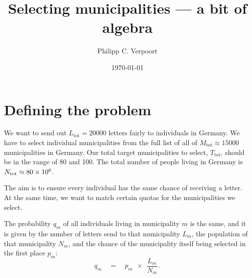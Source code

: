 \documentclass[%
 draft,
 aapm,
 mph,%
 amsmath,amssymb,
 reprint,%
]{revtex4-2}
\begin{document}
\title{Selecting municipalities — a bit of algebra}
\author{Philipp C. Verpoort}
\date{\today}


\newcommand{\secref}[2][]{Sec.~\ref{sec:#2}#1}
\newcommand{\figref}[2][]{Fig.~\ref{fig:#2}#1}
\newcommand{\tabref}[2][]{Tab.~\ref{tab:#2}#1}
\newcommand{\eqnref}[2][]{Eq.~(\ref{eq:#2}#1)}
\newcommand{\subfig}[1]{{\bf(#1)}}

\newcommand{\Ltot}{L_{\mathrm{tot}}}
\newcommand{\Ttot}{T_{\mathrm{tot}}}
\newcommand{\Mtot}{M_{\mathrm{tot}}}
\newcommand{\Ntot}{N_{\mathrm{tot}}}

\newcommand{\arr}[2]{\begin{array}{#1}#2\end{array}}

\newcommand{\punc}{\,}


\maketitle

\section{Defining the problem}
We want to send out $\Ltot = \num{20 000}$ letters fairly to individuals in Germany. We have to select individual municipalities from the full list of all of $\Mtot \approx \num{15 000}$ municipalities in Germany. Our total target municipalities to select, $\Ttot$,  should be in the range of 80 and 100. The total number of people living in Germany is $\Ntot \approx \num{80E+6}$.

The aim is to ensure every individual has the same chance of receiving a letter. At the same time, we want to match certain quotas for the municipalities we select.

The probability $q_m$ of all individuals living in municipality $m$ is the same, and it is given by the number of letters send to that municipality $L_m$, the population of that municipality $N_m$, and the chance of the municipality itself being selected in the first place $p_m$:
\begin{equation}
    q_m \quad = \quad p_m ~~ \times ~~ \frac{L_m}{N_m} \punc.
\end{equation}
\end{document}
